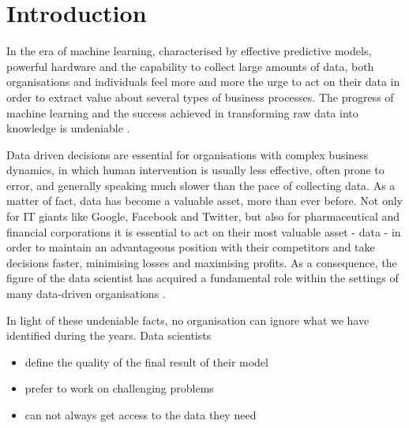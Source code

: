 \documentclass[12pt, a4paper,titlepage]{extreport}
\begin{document}
\section{Introduction}



In the era of machine learning, characterised by effective predictive models, powerful hardware and the capability to collect large amounts of data, both organisations and individuals feel more and more the urge to act on their data in order to extract value about several types of business processes. The progress of machine learning and the success achieved in transforming raw data into knowledge is undeniable \cite{successml}. 


Data driven decisions are essential for organisations with complex business dynamics, in which human intervention is usually less effective, often prone to error, and generally speaking much slower than the pace of collecting data. As a matter of fact, data has become a valuable asset, more than ever before. Not only for IT giants like Google, Facebook and Twitter, but also for pharmaceutical and financial corporations it is essential to act on their most valuable asset - data - in order to maintain an advantageous position with their competitors and take decisions faster, minimising losses and maximising profits. As a consequence, the figure of the data scientist has acquired a fundamental role within the settings of many data-driven organisations \cite{forbesds}.

In light of these undeniable facts, no organisation can ignore what we have identified during the years. Data scientists

\begin{itemize}
\item define the quality of the final result of their model
\item prefer to work on challenging problems
\item can not always get access to the data they need
\end{itemize}
\end{document}
